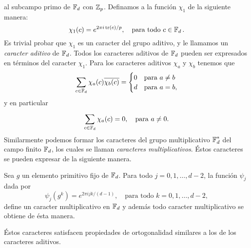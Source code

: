 al subcampo primo de $\operatorname{\mathbb{F}}_d$ con $\operatorname{\mathbb{Z}}_p$. Definamos a la
función $\chi_1$ de la siguiente manera:
\begin{equation}
  \chi_1(c)
  = e^{2\pi i \operatorname{tr}(c) / p},
  \quad
  \text{para todo } c \in \operatorname{\mathbb{F}}_d.
\end{equation}
Es trivial probar que $\chi_1$ es un caracter del grupo
aditivo, y le llamamos un \textit{caracter aditivo} de
$\operatorname{\mathbb{F}}_d$. Todos los caracteres aditivos de $\operatorname{\mathbb{F}}_d$ pueden ser
expresados en términos del caracter $\chi_1$. Para los
caracteres aditivos $\chi_a$ y $\chi_b$ tenemos que
\begin{equation}
  \sum_{c \in \operatorname{\mathbb{F}}_d}^{}
  \chi_a(c) \overline{\chi_b(c)}
  = \begin{cases}
    0 & \text{para } a \neq b \\
    d & \text{para } a = b,
  \end{cases}
\end{equation}
y en particular
\begin{equation}
  \sum_{c \in \operatorname{\mathbb{F}}_d}^{} \chi_a(c) = 0,
  \quad
  \text{para } a \neq 0.
\end{equation}
Similarmente podemos formar los caracteres del grupo
multiplicativo $\operatorname{\mathbb{F}}_d^{*}$ del campo finito $\operatorname{\mathbb{F}}_d$, los
cuales se llaman \textit{caracteres multiplicativos}. Éstos
caracteres se pueden expresar de la siguiente manera.
\begin{theorem}
  Sea $g$ un elemento primitivo fijo de $\operatorname{\mathbb{F}}_d$. Para todo $j
  = 0,1,\ldots,d-2$, la función $\psi_j$ dada por
  \begin{equation}
    \psi_j(g^{k})
    = e^{2\pi i j k / (d-1)},
    \quad
    \text{para todo } k = 0,1,\ldots,d-2,
  \end{equation}
  define un caracter multiplicativo en $\operatorname{\mathbb{F}}_d$ y además todo
  caracter multiplicativo se obtiene de ésta manera.
\end{theorem}
Éstos caracteres satisfacen propiedades de ortogonalidad
similares a los de los caracteres aditivos.

